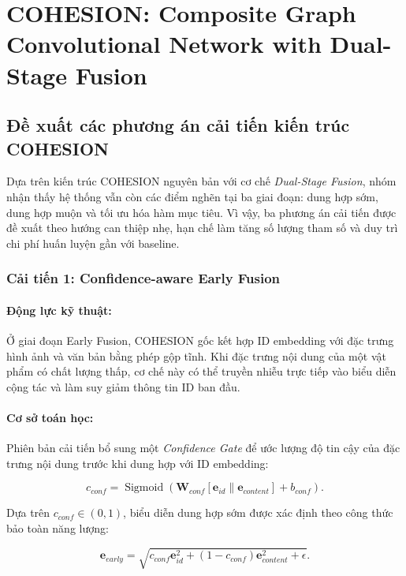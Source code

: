 \section{COHESION: Composite Graph Convolutional Network with Dual-Stage Fusion}

\subsection{Đề xuất các phương án cải tiến kiến trúc COHESION}

Dựa trên kiến trúc COHESION nguyên bản với cơ chế \textit{Dual-Stage Fusion}, nhóm nhận thấy hệ thống vẫn còn các điểm nghẽn tại ba giai đoạn: dung hợp sớm, dung hợp muộn và tối ưu hóa hàm mục tiêu. Vì vậy, ba phương án cải tiến được đề xuất theo hướng can thiệp nhẹ, hạn chế làm tăng số lượng tham số và duy trì chi phí huấn luyện gần với baseline.

\subsubsection{Cải tiến 1: Confidence-aware Early Fusion}

\paragraph{Động lực kỹ thuật:}
Ở giai đoạn Early Fusion, COHESION gốc kết hợp ID embedding với đặc trưng hình ảnh và văn bản bằng phép gộp tĩnh. Khi đặc trưng nội dung của một vật phẩm có chất lượng thấp, cơ chế này có thể truyền nhiễu trực tiếp vào biểu diễn cộng tác và làm suy giảm thông tin ID ban đầu.

\paragraph{Cơ sở toán học:}
Phiên bản cải tiến bổ sung một \textit{Confidence Gate} để ước lượng độ tin cậy của đặc trưng nội dung trước khi dung hợp với ID embedding:

\begin{equation}
c_{conf}=\operatorname{Sigmoid}\!\left(
\mathbf{W}_{conf}[\mathbf{e}_{id}\parallel\mathbf{e}_{content}]+b_{conf}
\right).
\end{equation}

Dựa trên $c_{conf}\in(0,1)$, biểu diễn dung hợp sớm được xác định theo công thức bảo toàn năng lượng:

\begin{equation}
\mathbf{e}_{early}
=\sqrt{
c_{conf}\mathbf{e}_{id}^{2}
+(1-c_{conf})\mathbf{e}_{content}^{2}
+\epsilon
}.
\end{equation}

